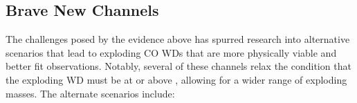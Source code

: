 

\subsection{Brave New Channels}
\label{ssec:c1_new_typeia}


The challenges posed by the evidence above has spurred research into alternative scenarios that lead to exploding CO WDs that are more physically viable and better fit observations.  Notably, several of these channels relax the condition that the exploding WD must be at or above \Mch, allowing for a wider range of exploding masses.  The alternate scenarios include:

